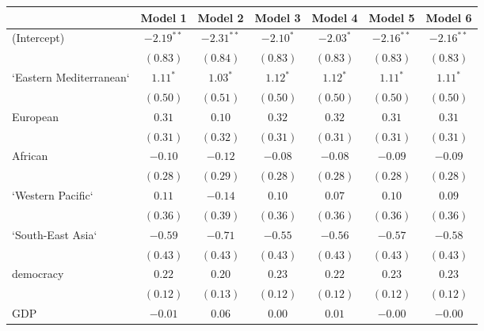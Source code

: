 
\begin{table}[!h]
\begin{center}
\begin{tabular}{l c c c c c c }
\toprule
 & Model 1 & Model 2 & Model 3 & Model 4 & Model 5 & Model 6 \\
\midrule
(Intercept)             & $-2.19^{**}$ & $-2.31^{**}$ & $-2.10^{*}$  & $-2.03^{*}$  & $-2.16^{**}$ & $-2.16^{**}$ \\
                        & $(0.83)$     & $(0.84)$     & $(0.83)$     & $(0.83)$     & $(0.83)$     & $(0.83)$     \\
`Eastern Mediterranean` & $1.11^{*}$   & $1.03^{*}$   & $1.12^{*}$   & $1.12^{*}$   & $1.11^{*}$   & $1.11^{*}$   \\
                        & $(0.50)$     & $(0.51)$     & $(0.50)$     & $(0.50)$     & $(0.50)$     & $(0.50)$     \\
European                & $0.31$       & $0.10$       & $0.32$       & $0.32$       & $0.31$       & $0.31$       \\
                        & $(0.31)$     & $(0.32)$     & $(0.31)$     & $(0.31)$     & $(0.31)$     & $(0.31)$     \\
African                 & $-0.10$      & $-0.12$      & $-0.08$      & $-0.08$      & $-0.09$      & $-0.09$      \\
                        & $(0.28)$     & $(0.29)$     & $(0.28)$     & $(0.28)$     & $(0.28)$     & $(0.28)$     \\
`Western Pacific`       & $0.11$       & $-0.14$      & $0.10$       & $0.07$       & $0.10$       & $0.09$       \\
                        & $(0.36)$     & $(0.39)$     & $(0.36)$     & $(0.36)$     & $(0.36)$     & $(0.36)$     \\
`South-East Asia`       & $-0.59$      & $-0.71$      & $-0.55$      & $-0.56$      & $-0.57$      & $-0.58$      \\
                        & $(0.43)$     & $(0.43)$     & $(0.43)$     & $(0.43)$     & $(0.43)$     & $(0.43)$     \\
democracy               & $0.22$       & $0.20$       & $0.23$       & $0.22$       & $0.23$       & $0.23$       \\
                        & $(0.12)$     & $(0.13)$     & $(0.12)$     & $(0.12)$     & $(0.12)$     & $(0.12)$     \\
GDP                     & $-0.01$      & $0.06$       & $0.00$       & $0.01$       & $-0.00$      & $-0.00$      \\

\end{tabular}
\end{center}
\end{table}

